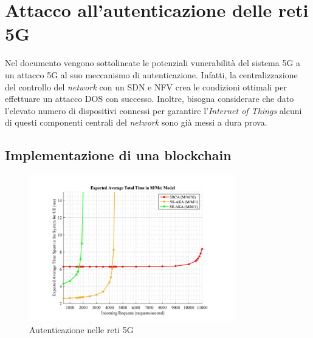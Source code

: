 \section{Attacco all'autenticazione delle reti 5G}
Nel documento \cite{5g-dos} vengono sottolineate le potenziali vunerabilità del sistema 5G a un attacco 5G al suo meccanismo di autenticazione.
Infatti, la centralizzazione del controllo del \textit{network} con un SDN e NFV crea le condizioni ottimali per effettuare un attacco DOS con successo.
Inoltre, bisogna considerare che dato l'elevato numero di dispositivi connessi per garantire l'\textit{Internet of Things} alcuni di questi componenti centrali del \textit{network}
sono già messi a dura prova.
\subsection{}
\subsection{Implementazione di una blockchain}
\begin{figure}[ht]
    \centering
    \includegraphics[width=0.8\textwidth]{images/5g-blockchain-dos.png}
    \caption{Autenticazione nelle reti 5G}
\end{figure}
\cite{5g-blockchain}